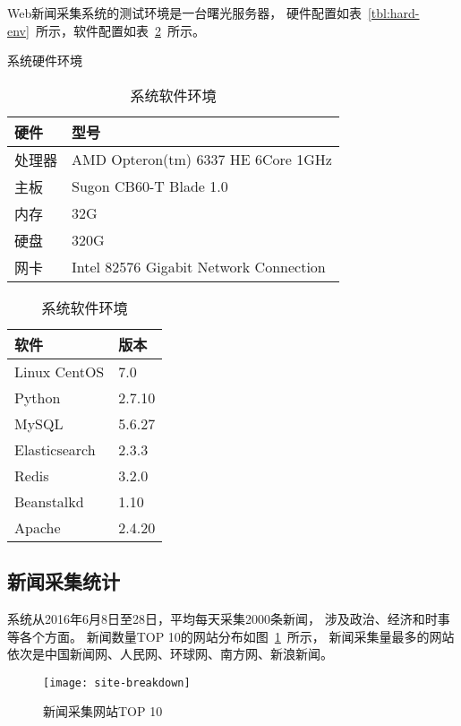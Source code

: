 Web新闻采集系统的测试环境是一台曙光服务器，
硬件配置如表~\ref{tbl:hard-env}~所示，软件配置如表~\ref{tbl:soft-env}~所示。

\begin{table}[htbp]
\centering
\begin{minipage}{0.45\textwidth}
\caption{系统硬件环境}
\label{tbl:hard-env}
\vspace{0.5em}\centering\wuhao
\begin{tabular}{ll}
\toprule[1.5pt]
硬件 & 型号 \\
\midrule[1pt]
处理器 & AMD Opteron(tm) 6337 HE 6Core 1GHz \\
主板 & Sugon CB60-T Blade 1.0 \\
内存 & 32G \\
硬盘 & 320G \\
网卡 & Intel 82576 Gigabit Network Connection \\
\bottomrule[1.5pt]
\end{tabular}
\end{minipage}
\hfill
\begin{minipage}{0.45\textwidth}
\caption{系统软件环境}
\label{tbl:soft-env}
\vspace{0.5em}\centering\wuhao
\begin{tabular}{ll}
\toprule[1.5pt]
软件 & 版本 \\
\midrule[1pt]
Linux CentOS & 7.0 \\
Python & 2.7.10 \\
MySQL & 5.6.27 \\
Elasticsearch & 2.3.3 \\
Redis & 3.2.0 \\
Beanstalkd & 1.10 \\
Apache & 2.4.20 \\
\bottomrule[1.5pt]
\end{tabular}
\end{minipage}
\end{table}

\subsection{新闻采集统计}

系统从2016年6月8日至28日，平均每天采集2000条新闻，
涉及政治、经济和时事等各个方面。
新闻数量TOP 10的网站分布如图~\ref{fig:site-breakdown}~所示，
新闻采集量最多的网站依次是中国新闻网、人民网、环球网、南方网、新浪新闻。

\begin{figure}[htbp]
\centering
\texttt{[image: site-breakdown]}
\caption{新闻采集网站TOP 10}
\label{fig:site-breakdown}
\end{figure}

